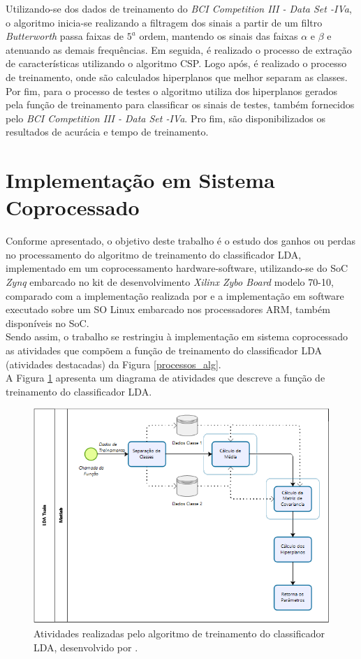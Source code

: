 Utilizando-se dos dados de treinamento do \textit{BCI Competition III - Data Set -IVa}, o algoritmo inicia-se realizando a filtragem dos sinais a partir de um filtro \textit{Butterworth} passa faixas de {$5^a$} ordem, mantendo os sinais das faixas {$\alpha$} e {$\beta$} e atenuando as demais frequências. Em seguida, é realizado o processo de extração de características utilizando o algoritmo CSP. Logo após, é realizado o processo de treinamento, onde são calculados hiperplanos que melhor separam as classes. Por fim, para o processo de testes o algoritmo utiliza dos hiperplanos gerados pela função de treinamento para classificar os sinais de testes, também fornecidos pelo \textit{BCI Competition III - Data Set -IVa}. Pro fim, são disponibilizados os resultados de acurácia e tempo de treinamento.

\section{Implementação em Sistema Coprocessado}

Conforme apresentado, o objetivo deste trabalho é o estudo dos ganhos ou perdas no processamento do algoritmo de treinamento do classificador LDA, implementado em um coprocessamento hardware-software, utilizando-se do SoC \textit{Zynq} embarcado no kit de desenvolvimento \textit{Xilinx Zybo Board} modelo 70-10, comparado com a implementação realizada por \cite{F.Lotte} e a implementação em software executado sobre um SO Linux embarcado nos processadores ARM, também disponíveis no SoC. \\
Sendo assim, o trabalho se restringiu à implementação em sistema coprocessado as atividades que compõem a função de treinamento do classificador LDA (atividades destacadas) da Figura \ref{processos_alg}.\\
A Figura \ref{processos_train} apresenta um diagrama de atividades que descreve a função de treinamento do classificador LDA.

\begin{figure}[h]
	\centering
	\includegraphics[keepaspectratio=true,scale=0.6]{figuras/Processos_LDA_Train.PNG}
	\caption{Atividades realizadas pelo algoritmo de treinamento do classificador LDA, desenvolvido por \cite{F.Lotte}.}
	\label{processos_train}
\end{figure}


